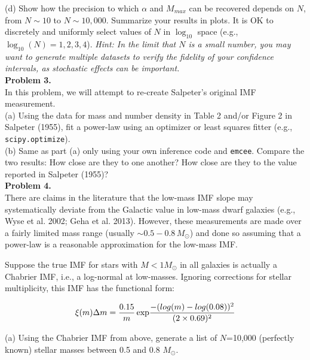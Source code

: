 \documentclass{article}
\begin{document}
(d) Show how the precision to which $\alpha$ and $M_{max}$ can be recovered depends on $N$, from $N \sim 10$ to $N\sim10,000$. Summarize your results in plots.  It is OK to discretely and uniformly select values of $N$ in $\log_{10}$ space (e.g., $\log_{10}(N) = 1,2,3,4$). \textit{Hint: In the limit that $N$ is a small number, you may want to generate multiple datasets to verify the fidelity of your confidence intervals, as stochastic effects can be important.}   \\


\noindent \textbf{Problem 3.} \\ 

In this problem, we will attempt to re-create Salpeter's original IMF measurement.  \\

(a) Using the data for mass and number density in Table 2 and/or Figure 2 in Salpeter (1955), fit a power-law using an optimizer or least squares fitter (e.g., \texttt{scipy.optimize}).\\

(b) Same as part (a) only using your own inference code and \texttt{emcee}.  Compare the two results:  How close are they to one another? How close are they to the value reported in Salpeter (1955)?  \\

\noindent \textbf{Problem 4.} \\ 

There are claims in the literature that the low-mass IMF slope may systematically deviate from the Galactic value in low-mass dwarf galaxies (e.g., Wyse et al. 2002; Geha et al. 2013).  However, these measurements are made over a fairly limited mass range (usually $\sim 0.5- 0.8 \, M_{\odot}$) and done so assuming that a power-law is a reasonable approximation for the low-mass IMF.

Suppose the true IMF for stars with $M<1 M_{\odot}$ in all galaxies is actually a Chabrier IMF, i.e., a log-normal at low-masses.  Ignoring corrections for stellar multiplicity, this IMF has the functional form:

\begin{equation}
\xi(m)\Delta m = \frac{0.15}{m} \, {\rm exp}\frac{-(log(m) - log(0.08))^2}{(2\times0.69)^2}
\end{equation}


(a) Using the Chabrier IMF from above, generate a list of $N$=10,000 (perfectly known) stellar masses between 0.5 and 0.8 $M_{\odot}$.  \\
\end{document}
